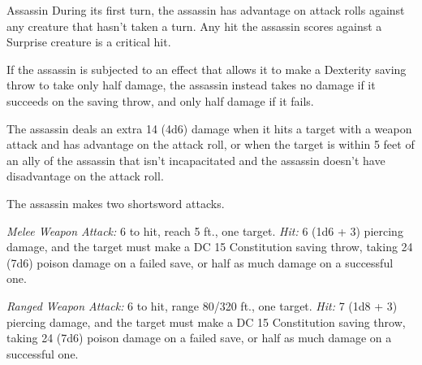 \documentclass[10pt,a4paper,twoside,bg=print,twocolumn,openany,nodeprecatedcode]{dndbook}
\begin{document}
\begin{DndMonster}[float=t]{Assassin}
\DndMonsterBasics[
armor-class = {15 (studded leather armor)},
hit-points = {\DndDice{12d8 + 24}},
speed = {30 ft.}
]
\DndMonsterAbilityScores[
 str = 11,
 dex = 16,
 con = 14,
 int = 13,
 wis = 11,
 cha = 10
]
\DndMonsterDetails[
saving-throws = {Dex +6, Int +4},
skills = {Acrobatics +6, Deception +3, Perception +3, Stealth +9},
damage-resistances = {poison},
languages = {Thieves' cant plus any two languages},
challenge = 8,
]
During its first turn, the assassin has advantage on attack rolls against any creature that hasn't taken a turn. Any hit the assassin scores against a Surprise creature is a critical hit.

If the assassin is subjected to an effect that allows it to make a Dexterity saving throw to take only half damage, the assassin instead takes no damage if it succeeds on the saving throw, and only half damage if it fails.

The assassin deals an extra 14 (4d6) damage when it hits a target with a weapon attack and has advantage on the attack roll, or when the target is within 5 feet of an ally of the assassin that isn't incapacitated and the assassin doesn't have disadvantage on the attack roll.

The assassin makes two shortsword attacks.

\textsl{Melee Weapon Attack:} 6 to hit, reach 5 ft., one target. \textsl{Hit:} 6 (1d6 + 3) piercing damage, and the target must make a DC 15 Constitution saving throw, taking 24 (7d6) poison damage on a failed save, or half as much damage on a successful one.

\textsl{Ranged Weapon Attack:} 6 to hit, range 80/320 ft., one target. \textsl{Hit:} 7 (1d8 + 3) piercing damage, and the target must make a DC 15 Constitution saving throw, taking 24 (7d6) poison damage on a failed save, or half as much damage on a successful one.

\end{DndMonster}
\end{document}
